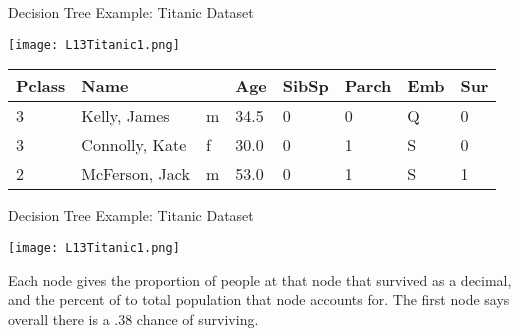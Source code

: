 \documentclass[10pt, table, dvipsnames,xcdraw]{beamer}
\begin{document}
\begin{frame}[fragile]{Decision Tree Example: Titanic Dataset}
  \begin{minipage}[t][0.6\textheight][t]{\textwidth}
	\centering \texttt{[image: L13Titanic1.png]} 
  \end{minipage}
  \vfill
\begin{minipage}[t][0.4\textheight][t]{\textwidth}
\begin{table}[]
\begin{tabular}{|l|l|l|l|l|l|l|l|}
\hline
\rowcolor[HTML]{656565} 
{\color[HTML]{EFEFEF} Pclass} & {\color[HTML]{EFEFEF} Name} & \multicolumn{1}{c|}{\cellcolor[HTML]{656565}{\color[HTML]{EFEFEF} Sex}} & {\color[HTML]{EFEFEF} Age} & {\color[HTML]{EFEFEF} SibSp} & {\color[HTML]{EFEFEF} Parch}  & {\color[HTML]{FFFFFF} Emb} & {\color[HTML]{FFFFFF} Sur} \\ \hline
3                             & Kelly, James            & m                                                                       & 34.5                       & 0                            & 0                                                & Q    & 0                           \\ \hline
3                             & Connolly, Kate        & f                                                                       & 30.0                       & 0                            & 1                                                 & S    & 0                           \\ \hline
2                             & McFerson, Jack        & m                                                                       & 53.0                       & 0                            & 1                                                 & S    & 1                           \\ \hline
\end{tabular}
\end{table}
\end{minipage}
\end{frame}




\begin{frame}[fragile]{Decision Tree Example: Titanic Dataset}
  \begin{minipage}[t][0.6\textheight][t]{\textwidth}
	\centering \texttt{[image: L13Titanic1.png]} 
  \end{minipage}
  \vfill
\begin{minipage}[t][0.4\textheight][t]{\textwidth}
Each node gives the proportion of people at that node that survived as a decimal, and the percent of to total population that node accounts for. \pause The first node says overall there is a .38  chance of surviving. 
\end{minipage}
\end{frame}
\end{document}
